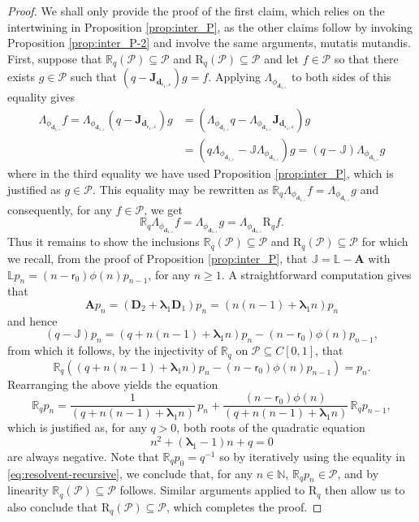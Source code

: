 \documentclass[10pt]{amsart}
\let\epsilon\varepsilon
\theoremstyle{plain}
\theoremstyle{definition}
\newcommand{\N}{\mathbb{N}}
\newcommand{\Poly}{\mathscr{P}}
\newcommand{\calL}{\mathds{L}}
\newcommand{\calJ}{\mathds{J}}
\newcommand{\calJd}{\mathbf{J}}
\newcommand{\dpt}{\bm{d}_{\vat,\epsilon}}
\newcommand{\dz}{{\bm{d}}_{1,\epsilon}}
\newcommand{\lam}{{\bm{\lambda}_1}}
\newcommand{\tet}{{\mathsf{r}_0}}
\newcommand{\vat}{{\mathsf{r}_1}}
\begin{document}
\begin{proof}
We shall only provide the proof of the first claim, which relies on the intertwining in Proposition \ref{prop:inter_P}, as the other claims follow by invoking Proposition \ref{prop:inter_P-2} and involve the same arguments, mutatis mutandis. First, suppose that $\mathds{R}_q(\Poly) \subseteq \Poly$ and $\mathrm{R}_q(\Poly) \subseteq \Poly$ and let $f \in \Poly$ so that there exists $g \in \Poly$ such that $(q-\calJd_{\dpt})g = f$. Applying $\Lambda_{\phi_{\dz}}$ to both sides of this equality gives
\begin{align*}
\Lambda_{\phi_{\dz}} f = \Lambda_{\phi_{\dz}}(q-\calJd_{\dpt})g &= (\Lambda_{\phi_{\dz}} q - \Lambda_{\phi_{\dz}}\calJd_{\dpt})g\\
&= (q\Lambda_{\phi_{\dz}} - \calJ \Lambda_{\phi_{\dz}})g = (q-\calJ)\Lambda_{\phi_{\dz}} g
\end{align*}
where in the third equality we have used Proposition \ref{prop:inter_P}, which is justified as $g \in \Poly$. This equality may be rewritten as $\mathds{R}_q \Lambda_{\phi_{\dz}} f = \Lambda_{\phi_{\dz}} g$ and consequently, for any $f \in \Poly$, we get
\begin{equation*}
\mathds{R}_q \Lambda_{\phi_{\dz}} f = \Lambda_{\phi_{\dz}} g = \Lambda_{\phi_{\dz}} \mathrm{R}_q f.
\end{equation*}
Thus it remains to show the inclusions $\mathds{R}_q(\Poly) \subseteq \Poly$ and $\mathrm{R}_q(\Poly) \subseteq \Poly$ for which we recall, from the proof of Proposition \ref{prop:inter_P}, that $\calJ = \calL-\mathbf{A}$ with $\calL p_n = (n-\tet)\phi(n)p_{n-1}$, for any $n \geq 1$. A straightforward computation gives that
\[
\mathbf{A} p_n = (\mathbf{D}_2 + \lam \mathbf{D}_1)p_n = (n(n-1)+\lam n)p_n
\]
and hence
\begin{equation*}
(q-\calJ)p_n = (q+n(n-1)+\lam n)p_n-(n-\tet)\phi(n)p_{n-1},
\end{equation*}
from which it follows, by the injectivity of $\mathds{R}_q$ on $\Poly \subseteq C[0,1]$, that
\begin{equation*}
\mathds{R}_q\left((q+n(n-1)+\lam n)p_n-(n-\tet)\phi(n)p_{n-1}\right) = p_n.
\end{equation*}
Rearranging the above yields the equation
\begin{equation}
\label{eq:resolvent-recursive}
\mathds{R}_q p_n = \frac{1}{(q+n(n-1)+\lam n)}\, p_n + \frac{(n-\tet)\phi(n)}{(q+n(n-1)+\lam n)}\, \mathds{R}_q p_{n-1},
\end{equation}
which is justified as, for any $q > 0$, both roots of the quadratic equation
\[
n^2+(\lam-1)n+q = 0
\]
are always negative. Note that $\mathds{R}_q p_0 = q^{-1}$ so by iteratively using the equality in \eqref{eq:resolvent-recursive}, we conclude that, for any $n\!\in\!\N$, $\mathds{R}_q p_n\!\in\!\Poly$, and by linearity $\mathds{R}_q(\Poly)\!\subseteq\!\Poly$ follows. Similar arguments applied to $\mathrm{R}_q$ then allow us to also conclude that $\mathrm{R}_q(\Poly) \subseteq \Poly$, which completes the proof.
\end{proof}
\end{document}
